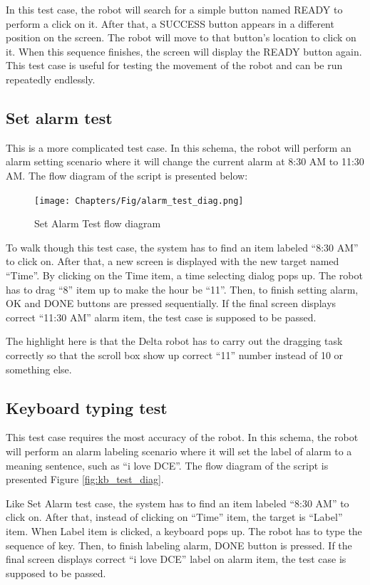 In this test case, the robot will search for a simple button named READY to perform a click on it. After that, a SUCCESS button appears in a different position on the screen. The robot will move to that button's location to click on it. When this sequence finishes, the screen will display the READY button again.
This test case is useful for testing the movement of the robot and can be run repeatedly endlessly.

\subsection{Set alarm test}
This is a more complicated test case. In this schema, the robot will perform an alarm setting scenario where it will change the current alarm at 8:30 AM to 11:30 AM. The flow diagram of the script is presented below:

	\begin{figure}[H]
		\centering
		\texttt{[image: Chapters/Fig/alarm\_test\_diag.png]}
		\caption{Set Alarm Test flow diagram}
		\label{fig:alarm_test_diag}
	\end{figure}

To walk though this test case, the system has to find an item labeled ``8:30 AM'' to click on. After that, a new screen is displayed with the new target named ``Time''. By clicking on the Time item, a time selecting dialog pops up. The robot has to drag ``8'' item up to make the hour be ``11''. Then, to finish setting alarm, OK and DONE buttons are pressed sequentially. If the final screen displays correct ``11:30 AM'' alarm item, the test case is supposed to be passed.

The highlight here is that the Delta robot has to carry out the dragging task correctly so that the scroll box show up correct ``11'' number instead of 10 or something else.

\subsection{Keyboard typing test}
This test case requires the most accuracy of the robot. In this schema, the robot will perform an alarm labeling scenario where it will set the label of alarm to a meaning sentence, such as ``i love DCE''. The flow diagram of the script is presented Figure \ref{fig:kb_test_diag}.

Like Set Alarm test case, the system has to find an item labeled ``8:30 AM'' to click on. After that, instead of clicking on ``Time'' item, the target is ``Label'' item. When Label item is clicked, a keyboard pops up. The robot has to type the sequence of key. Then, to finish labeling alarm, DONE button is pressed. If the final screen displays correct ``i love DCE'' label on alarm item, the test case is supposed to be passed.

